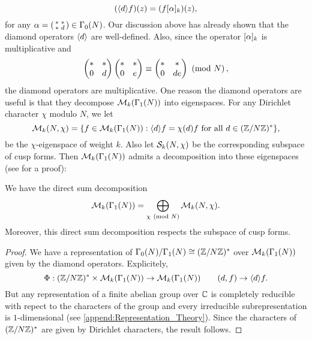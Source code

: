       \[
        (\langle d\rangle f)(z) = (f[\alpha]_{k})(z),
      \]
      for any $\alpha = \begin{psmallmatrix} \ast & \ast \\ \ast & d \end{psmallmatrix} \in \Gamma_{0}(N)$. Our discussion above has already shown that the diamond operators $\langle d\rangle$ are well-defined. Also, since the operator $[\alpha]_{k}$ is multiplicative and
      \[
        \begin{pmatrix} \ast & \ast \\ 0 & d \end{pmatrix}\begin{pmatrix} \ast & \ast \\ 0 & e \end{pmatrix} \equiv \begin{pmatrix} \ast & \ast \\ 0 & de \end{pmatrix} \ \left(\text{mod }N\right),
      \]
      the diamond operators are multiplicative. One reason the diamond operators are useful is that they decompose $\mathcal{M}_{k}(\Gamma_{1}(N))$ into eigenspaces. For any Dirichlet character $\chi$ modulo $N$, we let
      \[
        \mathcal{M}_{k}(N,\chi) = \{f \in \mathcal{M}_{k}(\Gamma_{1}(N)):\langle d\rangle f = \chi(d)f \text{ for all } d \in (\mathbb{Z}/N\mathbb{Z})^{\ast}\},
      \]
      be the $\chi$-eigenspace of weight $k$. Also let $\mathcal{S}_{k}(N,\chi)$ be the corresponding subspace of cusp forms. Then $\mathcal{M}_{k}(\Gamma_{1}(N))$ admits a decomposition into these eigenspaces (see \cite{diamond2005first} for a proof):

      \begin{proposition}\label{thm:diamond_operator_decomposition_modular}
        We have the direct sum decomposition
        \[
          \mathcal{M}_{k}(\Gamma_{1}(N)) = \bigoplus_{\chi \ \left(\text{mod }N\right)}\mathcal{M}_{k}(N,\chi).
        \]
        Moreover, this direct sum decomposition respects the subspace of cusp forms.
      \end{proposition}
      \begin{proof}
        We have a representation of $\Gamma_{0}(N)/\Gamma_{1}(N) \cong (\mathbb{Z}/N\mathbb{Z})^{\ast}$ over $\mathcal{M}_{k}(\Gamma_{1}(N))$ given by the diamond operators. Explicitely,
        \[
          \Phi:(\mathbb{Z}/N\mathbb{Z})^{\ast} \times \mathcal{M}_{k}(\Gamma_{1}(N)) \to \mathcal{M}_{k}(\Gamma_{1}(N)) \qquad (d,f) \to \langle d\rangle f.
        \]
        But any representation of a finite abelian group over $\mathbb{C}$ is completely reducible with repect to the characters of the group and every irreducible subrepresentation is $1$-dimensional (see \cref{append:Representation_Theory}). Since the characters of $(\mathbb{Z}/N\mathbb{Z})^{\ast}$ are given by Dirichlet characters, the result follows.
      \end{proof}
      
